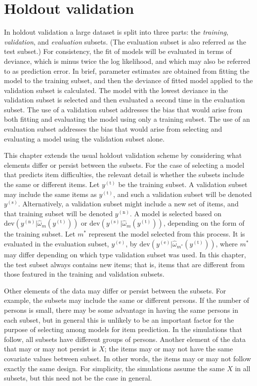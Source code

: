\section{Holdout validation}

In holdout validation a large dataset is split into three parts: the \emph{training}, \emph{validation}, and \emph{evaluation} subsets. 
(The evaluation subset is also referred as the test subset.)
For consistency, the fit of models will be evaluated in terms of deviance, which is minus twice the log likelihood, and which may also be referred to as prediction error.
In brief, parameter estimates are obtained from fitting the model to the training subset, and then the deviance of fitted model applied to the validation subset is calculated. 
The model with the lowest deviance in the validation subset is selected and then evaluated a second time in the evaluation subset.
The use of a validation subset addresses the bias that would arise from both fitting and evaluating the model using only a training subset.
The use of an evaluation subset addresses the bias that would arise from selecting and evaluating a model using the validation subset alone.

This chapter extends the usual holdout validation scheme by considering what elements differ or persist between the subsets. 
For the case of selecting a model that predicts item difficulties, the relevant detail is whether the subsets include the same or different items. 
Let $y^{(\mathrm{t})}$ be the training subset. 
A validation subset may include the same items as $y^{(\mathrm{t})}$, and such a validation subset will be denoted $y^{(\mathrm{s})}$. 
Alternatively, a validation subset might include a new set of items, and that training subset will be denoted $y^{(\mathrm{n})}$. 
A model is selected based on 
	$\mathrm{dev}(y^{(\mathrm{n})} | \hat \omega_m(y^{(\mathrm{t})}))$ or
	$\mathrm{dev}(y^{(\mathrm{s})} | \hat \omega_m(y^{(\mathrm{t})}))$, 
	depending on the form of the training subset.
Let $m^*$ represent the model selected from this process.
It is evaluated in the evaluation subset, $y^{(\mathrm{e})}$, by 
	$\mathrm{dev}(y^{(\mathrm{e})} | \hat \omega_{m^*}(y^{(\mathrm{t})}))$,
where $m^*$ may differ depending on which type validation subset was used.
In this chapter, the test subset always contains new items; that is, items that are different from those featured in the training and validation subsets.

Other elements of the data may differ or persist between the subsets. For example, the subsets may include the same or different persons. If the number of persons is small, there may be some advantage in having the same persons in each subset, but in general this is unlikely to be an important factor for the purpose of selecting among models for item prediction. In the simulations that follow, all subsets have different groups of persons. Another element of the data that may or may not persist is $X$; the items may or may not have the same covariate values between subset. In other words, the items may or may not follow exactly the same design. For simplicity, the simulations assume the same $X$ in all subsets, but this need not be the case in general.

